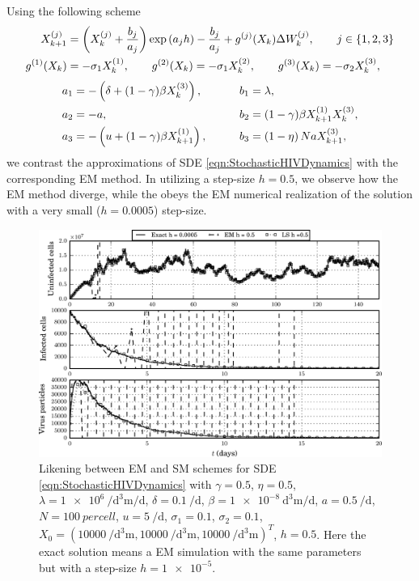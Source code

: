 	Using the following \SM scheme
\begin{align}\label{eqn:SteklovSchemMaoAdis2}
	X^{(j)}_{k+1}
			&=
			\left(
				X_k^{(j)} + 
				\frac{b_j }{a_j}
			\right) 
			\exp\left(
					a_j h
				\right) - \frac{b_j}{a_j}
		+ g^{(j)}(X_k) \Delta W^{(j)}_k, \qquad j \in \{1,2,3\} \notag 
		\\
	g^{(1)}(X_k) &=- \sigma_1 X_{k}^{(1)},  \qquad
	g^{(2)}(X_k)= - \sigma_1 X_{k}^{(2)}, \qquad
	g^{(3)}(X_k)= - \sigma_2 X_{k}^{(3)}, \notag
\end{align}
\begin{alignat}{2}%
	a_{1} &= 
		-\left(
			\delta + (1 - \gamma) \beta X_{k}^{(3)}
		\right),
	& \qquad
	b_1 &= \lambda, \notag
	\\
	a_{2} &= -a,
	& \qquad
	b_2 &=
		(1-\gamma) \beta X_{k+1}^{(1)} X_{k}^{(3)}, 
\\
	a_{3} &= 
		-
	\left(
			u + (1- \gamma) \beta X_{k+1}^{(1)}
		\right),
	& \qquad
	b_{3} &= 
		\left(
			1 - \eta 
		\right)
		N a X_{k+1}^{(3)}, \notag
\end{alignat}
we contrast the approximations of SDE \eqref{eqn:StochasticHIVDynamics} with the corresponding EM method.
In  utilizing a step-size $h=\num{0.5}$, we observe how the EM method diverge,
while the \SM obeys the EM numerical realization of the solution with a very small ($h=\num{0.0005}$) step-size.
\begin{figure}[htb]
	\begin{center}
		\includegraphics{./papers/paperB/figures/InternalHIVDynamics5e-1.png}
		\caption{
			Likening between EM and SM schemes for SDE \eqref{eqn:StochasticHIVDynamics} with
			$\gamma = \num{0.5}$,
			$\eta = \num{0.5}$,
			$\lambda = \SI{1e6}{\per\cubic\deci\meter\per\day}$,
			$\delta = \SI{0.1}{\per\day}$,
			$\beta = \SI{1e-8}{\cubic\deci\meter\per\day}$,
			$a = \SI{0.5}{\per \day}$,
			$N = \SI{100}{per cell}$,
			$u = \SI{5}{\per\day} $,
			$\sigma_1 = \num{0.1}$,
			$\sigma_2 = \num{0.1} $,
			$X_0 = (\SI{10000}{\per\cubic\deci\meter}, \SI{10000}{\per\cubic\deci\meter}, 
			\SI{10000}{\per\cubic\deci\meter})^T$,
			$h=\num{0.5}$.
			Here the exact solution means a EM simulation
			with the same parameters but with a step-size $h=\num{1e-5}$.
		}
		\label{fig:StochasticHIVDynamicsPaths}
	\end{center}
\end{figure}

